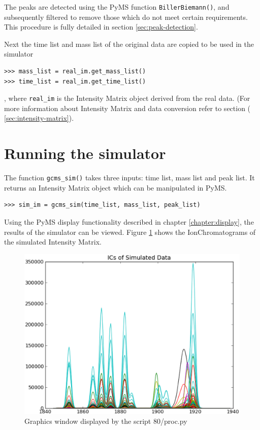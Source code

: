 The peaks are detected using the PyMS function {\tt BillerBiemann()}, and subsequently
filtered to remove those which do not meet certain requirements. This procedure is
fully detailed in section \ref{sec:peak-detection}.

Next the time list and mass list of the original data are copied to be used in the
simulator 
\begin{verbatim}
>>> mass_list = real_im.get_mass_list()
>>> time_list = real_im.get_time_list()
\end{verbatim}

, where {\tt real\_im} is the Intensity Matrix object derived from the real data. (For
more information about Intensity Matrix and data conversion refer to section (
\ref{sec:intensity-matrix}).

\section{Running the simulator}
The function {\tt gcms\_sim()} takes three inputs: time list, mass list and peak list.
It returns an Intensity Matrix object which can be manipulated in PyMS.

\begin{verbatim}
>>> sim_im = gcms_sim(time_list, mass_list, peak_list)
\end{verbatim}

Using the PyMS display functionality described in chapter \ref{chapter:display}, the results of 
the simulator can be viewed. Figure \ref{fig:no-noise} shows the IonChromatograms of the 
simulated Intensity Matrix.

\begin{figure}[h]
  \begin{center}
    \includegraphics[scale=0.25]{graphics/chapter10/test-80.eps}
  \end{center}
  \caption{Graphics window displayed by the script 80/proc.py}
  \label{fig:no-noise}
\end{figure}


